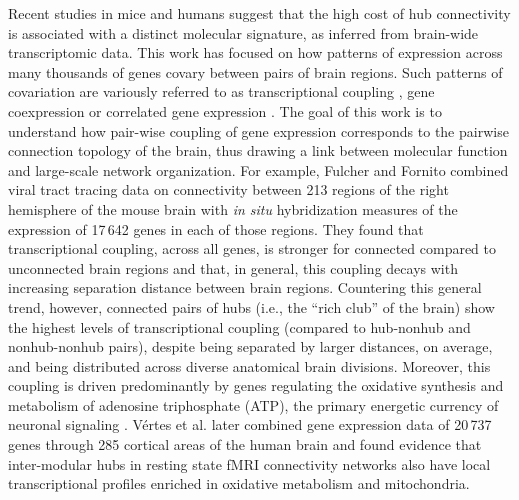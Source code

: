 \documentclass[10pt,letterpaper]{article}
\begin{document}
Recent studies in mice and humans suggest that the high cost of hub connectivity is associated with a distinct
molecular signature, as inferred from brain-wide transcriptomic data. 
This work has focused on how patterns of expression across many thousands of genes covary between pairs of brain regions.
Such patterns of covariation are variously referred to as transcriptional coupling \cite{Fulcher:2016ck}, gene coexpression \cite{Krienen:2016eq} or correlated gene expression \cite{Richiardi2015, Mills2017, Goel2014}.
The goal of this work is to understand how pair-wise coupling of gene expression corresponds to the pairwise connection topology of the brain, thus drawing a link between molecular function and large-scale network organization.
For example, Fulcher and Fornito \cite{Fulcher:2016ck} combined viral tract tracing data on connectivity between 213 regions of the right hemisphere of the mouse brain \cite{Oh2014} with \emph{in situ} hybridization measures of the expression of 17\,642 genes in each of those regions.
They found that transcriptional coupling, across all genes, is stronger for connected compared to unconnected brain regions and that, in general, this coupling decays with increasing separation distance between brain regions.
Countering this general trend, however, connected pairs of hubs (i.e., the ``rich club'' of the brain) show the highest levels of transcriptional coupling (compared to hub-nonhub and nonhub-nonhub pairs), despite being separated by larger distances, on average, and being distributed across diverse anatomical brain divisions.
Moreover, this coupling is driven predominantly by genes regulating the oxidative synthesis and metabolism of adenosine triphosphate (ATP), the primary energetic currency of neuronal signaling \cite{Lennie:2003ia, Laughlin:2003vu}.
V\'ertes et al. \cite{Vertes2016a} later combined gene expression data of 20\,737 genes through 285 cortical areas of the human brain and found evidence that inter-modular hubs in resting state fMRI connectivity networks also have local transcriptional profiles enriched in oxidative metabolism and mitochondria.
\end{document}
